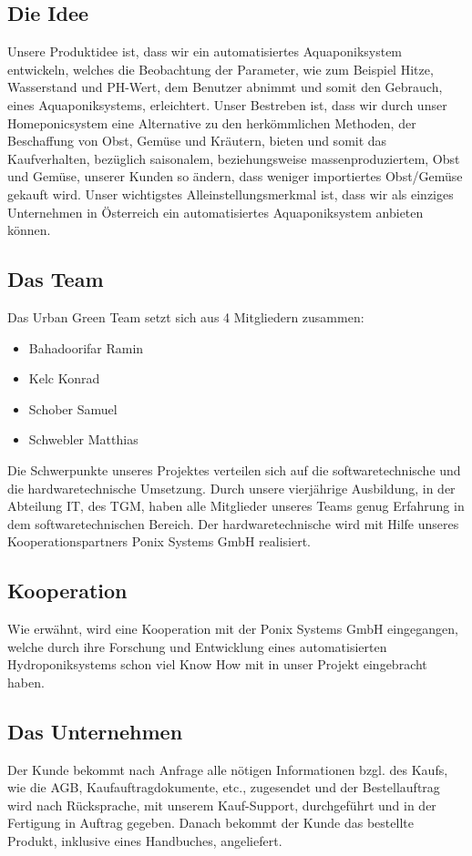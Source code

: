 \documentclass[11pt]{article}
\begin{document}
\subsection{Die Idee}
Unsere Produktidee ist, dass wir ein automatisiertes Aquaponiksystem entwickeln, welches die Beobachtung der Parameter, wie zum Beispiel Hitze, Wasserstand und PH-Wert, dem Benutzer abnimmt und somit den Gebrauch, eines Aquaponiksystems, erleichtert. Unser Bestreben ist, dass wir durch unser Homeponicsystem eine Alternative zu den herkömmlichen Methoden, der Beschaffung von Obst, Gemüse und Kräutern, bieten und somit das Kaufverhalten, bezüglich saisonalem, beziehungsweise massenproduziertem, Obst und Gem\"use, unserer Kunden so ändern, dass weniger importiertes Obst/Gemüse gekauft wird. Unser wichtigstes Alleinstellungsmerkmal ist, dass wir als einziges Unternehmen in \"Osterreich ein automatisiertes Aquaponiksystem anbieten können.
\subsection{Das Team}
Das Urban Green Team setzt sich aus 4 Mitgliedern zusammen:
\begin{itemize}
    \item Bahadoorifar Ramin
    \item Kelc Konrad
    \item Schober Samuel
    \item Schwebler Matthias
\end{itemize}
Die Schwerpunkte unseres Projektes verteilen sich auf die softwaretechnische und die hardwaretechnische Umsetzung. Durch unsere vierjährige Ausbildung, in der Abteilung IT, des TGM, haben alle Mitglieder unseres Teams genug Erfahrung in dem softwaretechnischen Bereich. Der hardwaretechnische wird mit Hilfe unseres Kooperationspartners Ponix Systems GmbH realisiert.
\subsection{Kooperation}
Wie erwähnt, wird eine Kooperation mit der Ponix Systems GmbH eingegangen, welche durch ihre Forschung und Entwicklung eines automatisierten Hydroponiksystems schon viel Know How mit in unser Projekt eingebracht haben.
\subsection{Das Unternehmen}
Der Kunde bekommt nach Anfrage alle nötigen Informationen bzgl. des Kaufs, wie die AGB, Kaufauftragdokumente, etc., zugesendet und der Bestellauftrag wird nach Rücksprache, mit unserem Kauf-Support, durchgeführt und in der Fertigung in Auftrag gegeben. Danach bekommt der Kunde das bestellte Produkt, inklusive eines Handbuches, angeliefert.
\end{document}
